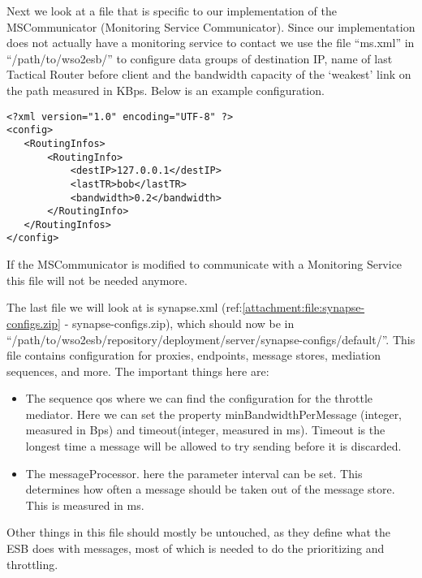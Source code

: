 	Next we look at a file that is specific to our implementation of the MSCommunicator (Monitoring Service Communicator). Since our implementation does not actually have a monitoring service to contact we use the file “ms.xml” in “/path/to/wso2esb/” to configure data groups of destination IP, name of last Tactical Router before client and the bandwidth capacity of the ‘weakest’ link on the path measured in KBps. Below is an example configuration.\\

\lstset{language=XML}
\lstset{showstringspaces=false}
\begin{lstlisting}[frame=single, caption={ppd.xml}, label=ppd listing, breaklines=true] %It is ok that this is not referenced in text =)
<?xml version="1.0" encoding="UTF-8" ?>
<config>
   <RoutingInfos>
	   <RoutingInfo>
	       <destIP>127.0.0.1</destIP>
	       <lastTR>bob</lastTR>
	       <bandwidth>0.2</bandwidth>
	   </RoutingInfo>
   </RoutingInfos>
</config>
\end{lstlisting}

	If the MSCommunicator is modified to communicate with a Monitoring Service this file will not be needed anymore.

	The last file we will look at is synapse.xml (ref:\ref{attachment:file:synapse-configs.zip} - synapse-configs.zip), which should now be in “/path/to/wso2esb/repository/deployment/server/synapse-configs/default/”. This file contains configuration for proxies, endpoints, message stores, mediation sequences, and more. The important things here are:
	\begin{itemize}
	\item The sequence qos where we can find the configuration for the throttle mediator. Here we can set the property minBandwidthPerMessage (integer, measured in Bps) and timeout(integer, measured in ms). Timeout is the longest time a message will be allowed to try sending before it is discarded.
	\item The messageProcessor. here the parameter interval can be set. This determines how often a message should be taken out of the message store. This is measured in ms.
	\end{itemize}
	Other things in this file should mostly be untouched, as they define what the ESB does with messages, most of which is needed to do the prioritizing and throttling.
